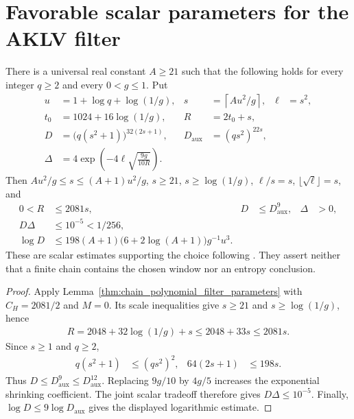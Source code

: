 \section{Favorable scalar parameters for the AKLV filter}

\begin{lemma}
    \label{thm:aklv_favorable_scalar_parameters}
    \leanok
    There is a universal real constant $A\ge21$ such that the following
    holds for every integer $q\ge2$ and every $0<g\le1$.
    Put
    \begin{align*}
        u                & =1+\log q+\log(1/g),                            &
        s                & =\left\lceil Au^2/g\right\rceil,                & \ell & =s^2,    \\
        t_0              & =1024+16\log(1/g),                              & R    & =2t_0+s, \\
        D                & =\bigl(q(s^2+1)\bigr)^{32(2s+1)},               &
        D_{\mathrm{aux}} & =(qs^2)^{22s},                                                    \\
        \Delta           & =4\exp\left(-4\ell\sqrt{\frac{9g}{10R}}\right).
    \end{align*}
    Then $Au^2/g\le s\le(A+1)u^2/g$, $s\ge21$, $s\ge\log(1/g)$,
    $\ell/s=s$, $\lfloor\sqrt\ell\rfloor=s$, and
    \begin{align*}
        0<R     & \le2081s,         & D & \le D_{\mathrm{aux}}^9, & \Delta & >0, \\
        D\Delta & \le10^{-5}<1/256,                                              \\
        \log D  & \le
        198(A+1)\bigl(6+2\log(A+1)\bigr)g^{-1}u^3.
    \end{align*}
    These are scalar estimates supporting the choice following
    \cite[Theorem~6.1]{Arad2013AreaLaw}. They assert neither that a finite
    chain contains the chosen window nor an entropy conclusion.
\end{lemma}
\begin{proof}
    \leanok
    Apply Lemma~\ref{thm:chain_polynomial_filter_parameters} with
    $C_H=2081/2$ and $M=0$. Its scale inequalities give $s\ge21$ and
    $s\ge\log(1/g)$, hence
    \begin{align*}
        R=2048+32\log(1/g)+s\le2048+33s\le2081s.
    \end{align*}
    Since $s\ge1$ and $q\ge2$,
    \begin{align*}
        q(s^2+1) & \le(qs^2)^2, & 64(2s+1) & \le198s.
    \end{align*}
    Thus $D\le D_{\mathrm{aux}}^9\le D_{\mathrm{aux}}^{12}$.
    Replacing $9g/10$ by $4g/5$ increases the exponential shrinking
    coefficient. The joint scalar tradeoff therefore gives
    $D\Delta\le10^{-5}$.
    Finally, $\log D\le9\log D_{\mathrm{aux}}$ gives the displayed
    logarithmic estimate.
\end{proof}


